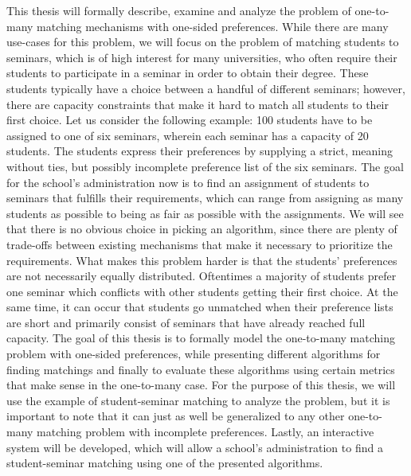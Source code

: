 This thesis will formally describe, examine and analyze the problem of one-to-many matching mechanisms with one-sided preferences. While there are many use-cases for this problem, we will focus on the problem of matching students to seminars, which is of high interest for many universities, who often require their students to participate in a seminar in order to obtain their degree. These students typically have a choice between a handful of different seminars; however, there are capacity constraints that make it hard to match all students to their first choice. Let us consider the following example: 100 students have to be assigned to one of six seminars, wherein each seminar has a capacity of 20 students. The students express their preferences by supplying a strict, meaning without ties, but possibly incomplete preference list of the six seminars. The goal for the school's administration now is to find an assignment of students to seminars that fulfills their requirements, which can range from assigning as many students as possible to being as fair as possible with the assignments. We will see that there is no obvious choice in picking an algorithm, since there are plenty of trade-offs between existing mechanisms that make it necessary to prioritize the requirements.  
What makes this problem harder is that the students' preferences are not necessarily equally distributed. Oftentimes a majority of students prefer one seminar which conflicts with other students getting their first choice. At the same time, it can occur that students go unmatched when their preference lists are short and primarily consist of seminars that have already reached full capacity.
\newline
The goal of this thesis is to formally model the one-to-many matching problem with one-sided preferences, while presenting different algorithms for finding matchings and finally to evaluate these algorithms using certain metrics that make sense in the one-to-many case. For the purpose of this thesis, we will use the example of student-seminar matching to analyze the problem, but it is important to note that it can just as well be generalized to any other one-to-many matching problem with incomplete preferences. Lastly, an interactive system will be developed, which will allow a school's administration to find a student-seminar matching using one of the presented algorithms. 

